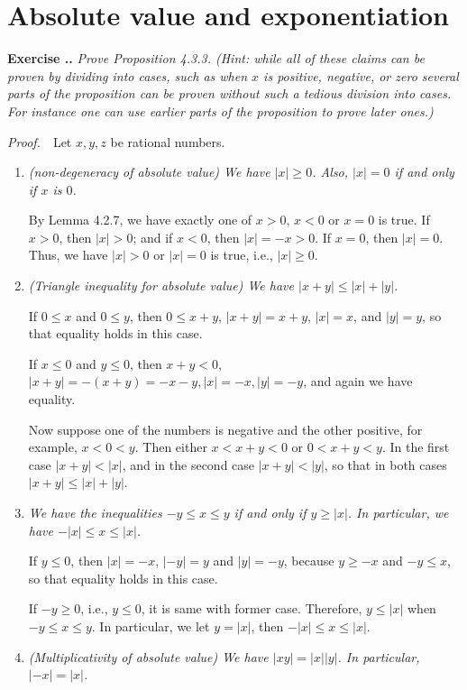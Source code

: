 \documentclass{book}
\newcommand{\pff}{\vspace{.25em}\noindent\emph{Proof.}~~}
\newcounter{Exercise}[section]
\renewcommand{\theExercise}{\thesection.\arabic{Exercise}.}
\newcommand{\new}{\vspace{1.5em}\noindent\textbf{{Exercise \stepcounter{Exercise}\textbf{\theExercise}}} }
\begin{document}
\section{Absolute value and exponentiation}

\new\emph{Prove Proposition 4.3.3. (Hint: while all of these claims can be proven by dividing into cases, such as when $x$ is positive, negative, or zero several parts of the proposition can be proven without such a tedious division into cases. For instance one can use earlier parts of the proposition to prove later ones.)}

\pff Let $x,y,z$ be rational numbers.
\begin{enumerate}
    \item \emph{(non-degeneracy of absolute value) We have $|x|\geq 0$. Also, $|x|=0$ if and only if $x$ is $0$.}

    By Lemma 4.2.7, we have exactly one of $x>0$, $x<0$ or $x=0$ is true. If $x>0$, then $|x|>0$; and if $x<0$, then $|x|=-x>0$. If $x=0$, then $|x|=0$. Thus, we have $|x|>0$ or $|x|=0$ is true, i.e., $|x|\geq 0$.

    \item \emph{(Triangle inequality for absolute value) We have $|x+y|\leq|x|+|y|$.}

    If $0\leq x$ and $0\leq y$, then $0\leq x+y$, $|x+y|=x+y$, $|x|=x$, and $|y|=y$, so that equality holds in this case.
    
    If $x\leq0$ and $y\leq0$, then $x+y<0$, $|x+y|=-(x+y)=-x-y,|x|=-x,|y|=-y$, and again we have equality.

    Now suppose one of the numbers is negative and the other positive, for example, $x<0<y$. Then either $x<x+y<0$ or $0<x+y<y$. In the first case $|x+y|<|x|$, and in the second case $|x+y|<|y|$, so that in both cases $|x+y|\leq|x|+|y|$.

    \item \emph{We have the inequalities $-y\leq x\leq y$ if and only if $y\geq|x|$. In particular, we have $-|x|\leq x\leq|x|$.}

    If $y\leq0$, then $|x|=-x$, $|-y|=y$ and $|y|=-y$, because $y\geq -x$ and $-y\leq x$, so that equality holds in this case.
    
    If $-y\geq 0$, i.e., $y\leq0$, it is same with former case. Therefore, $y\leq|x|$ when $-y\leq x\leq y$. In particular, we let $y=|x|$, then $-|x|\leq x\leq|x|$.

    \item \emph{(Multiplicativity of absolute value) We have $|xy|=|x||y|$. In particular, $|-x|=|x|$.}


\end{enumerate}
\end{document}
